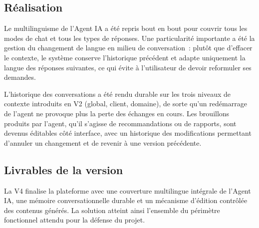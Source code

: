\documentclass[12pt,a4paper]{report}
\begin{document}
\subsection*{Réalisation}
Le multilinguisme de l'Agent IA a été repris bout en bout pour couvrir tous les modes de chat et tous les types de réponses. Une particularité importante a été la gestion du changement de langue en milieu de conversation~: plutôt que d'effacer le contexte, le système conserve l'historique précédent et adapte uniquement la langue des réponses suivantes, ce qui évite à l'utilisateur de devoir reformuler ses demandes.

L'historique des conversations a été rendu durable sur les trois niveaux de contexte introduits en V2 (global, client, domaine), de sorte qu'un redémarrage de l'agent ne provoque plus la perte des échanges en cours. Les brouillons produits par l'agent, qu'il s'agisse de recommandations ou de rapports, sont devenus éditables côté interface, avec un historique des modifications permettant d'annuler un changement et de revenir à une version précédente.

\subsection*{Livrables de la version}
La V4 finalise la plateforme avec une couverture multilingue intégrale de l'Agent IA, une mémoire conversationnelle durable et un mécanisme d'édition contrôlée des contenus générés. La solution atteint ainsi l'ensemble du périmètre fonctionnel attendu pour la défense du projet.
\end{document}

